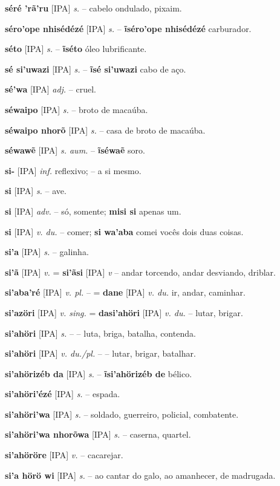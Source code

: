 \textbf{séré 'rã'ru} [IPA] \textit{s.} -- cabelo ondulado, pixaim.

\textbf{séro'ope nhisédézé} [IPA] \textit{s.} -- \textbf{ĩséro'ope nhisédézé} carburador.

\textbf{séto} [IPA] \textit{s.} -- \textbf{ĩséto} óleo lubrificante.

\textbf{sé si'uwazi} [IPA] \textit{s.} -- \textbf{ĩsé si'uwazi} cabo de aço.

\textbf{sé'wa} [IPA] \textit{adj.} -- cruel.

\textbf{séwaipo} [IPA] \textit{s.} -- broto de macaúba.

\textbf{séwaipo nhorõ} [IPA] \textit{s.} -- casa de broto de macaúba.

\textbf{séwawẽ} [IPA] \textit{s. aum.} -- \textbf{ĩséwaẽ} soro.

\textbf{si-} [IPA] \textit{inf.} reflexivo; -- a si mesmo.

\textbf{si} [IPA] \textit{s.} -- ave.

\textbf{si} [IPA] \textit{adv.} -- só, somente; \textbf{misi si} apenas um.

\textbf{si} [IPA] \textit{v. du.} -- comer; \textbf{si wa'aba} comei vocês dois duas coisas.

\textbf{si'a} [IPA] \textit{s.} -- galinha.

\textbf{si'ã} [IPA] \textit{v.} = \textbf{si'ãsi} [IPA] \textit{v} -- andar torcendo, andar desviando, driblar.

\textbf{si'aba'ré} [IPA] \textit{v. pl.} -- = \textbf{dane} [IPA] \textit{v. du.} ir, andar, caminhar.

\textbf{si'azöri} [IPA] \textit{v. sing.} = \textbf{dasi'ahöri} [IPA] \textit{v. du.} -- lutar, brigar.

\textbf{si'ahöri} [IPA] \textit{s.} -- -- luta, briga, batalha, contenda.

\textbf{si'ahöri} [IPA] \textit{v. du./pl.} -- -- lutar, brigar, batalhar.

\textbf{si'ahörizéb da} [IPA] \textit{s.} -- \textbf{ĩsi'ahörizéb de} bélico.

\textbf{si'ahöri'ézé} [IPA] \textit{s.} -- espada.

\textbf{si'ahöri'wa} [IPA] \textit{s.} -- soldado, guerreiro, policial, combatente.

\textbf{si'ahöri'wa nhorõwa} [IPA] \textit{s.} -- caserna, quartel.

\textbf{si'ahöröre} [IPA] \textit{v.} -- cacarejar.

\textbf{si'a hörö wi} [IPA] \textit{s.} -- ao cantar do galo, ao amanhecer, de madrugada.

